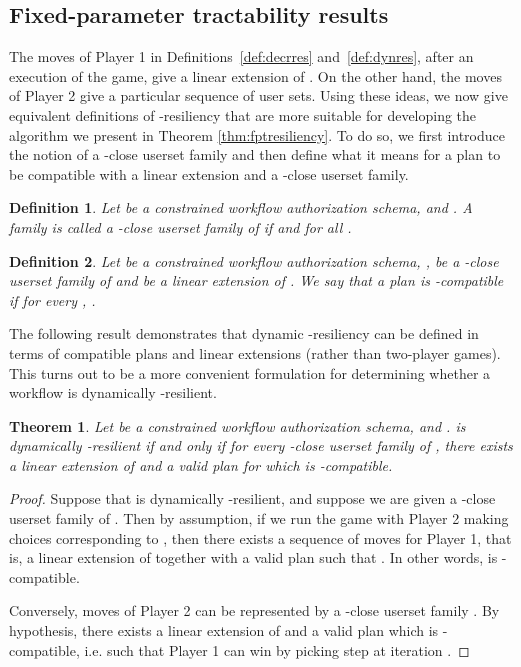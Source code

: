 \documentclass[jcs,crcready]{iosart1c}
\newtheorem{thm}{Theorem}
\newtheorem{df}{Definition}
\begin{document}
\subsection{Fixed-parameter tractability results}\label{sec:res:wangli}

The moves of Player 1 in Definitions~\ref{def:decrres} and~\ref{def:dynres}, after an execution of the game, give a linear extension  of . On the other hand, the moves of Player 2 give a particular sequence of user sets. Using these ideas, we now give equivalent definitions of -resiliency that are more suitable for developing the algorithm we present in Theorem \ref{thm:fptresiliency}. 
To do so, we first introduce the notion of a -close userset family and then define what it means for a plan to be compatible with a linear extension and a -close userset family.

 \begin{df}
 Let  be a constrained workflow authorization schema, and . A family  is called a {\em -close userset family} of  if  and  for all .
 \end{df}

 \begin{df}
 Let  be a constrained workflow authorization schema, ,  be a -close userset family of  and  be a linear extension of . We say that a plan  is {\em -compatible} if for every , .
 \end{df}
 
 The following result demonstrates that dynamic -resiliency can be defined in terms of compatible plans and linear extensions (rather than two-player games).
 This turns out to be a more convenient formulation for determining whether a workflow is dynamically -resilient.

\begin{thm}
 Let  be a constrained workflow authorization schema, and .  is dynamically -resilient if and only if for every -close userset family  of , there exists a linear extension  of  and a valid plan for  which is -compatible. 
 \end{thm}
 \begin{proof}
Suppose that  is dynamically -resilient, and suppose we are given a -close userset family  of . Then by assumption, if we run the game with Player 2 making choices corresponding to , then there exists a sequence of moves for Player 1, that is, a linear extension  of  together with a valid plan  such that . In other words,  is -compatible.

Conversely, moves of Player 2 can be represented by a -close userset family . By hypothesis, there exists a linear extension  of  and a valid plan  which is -compatible, i.e. such that Player 1 can win by picking step  at iteration .
 \end{proof}
 
\end{document}
